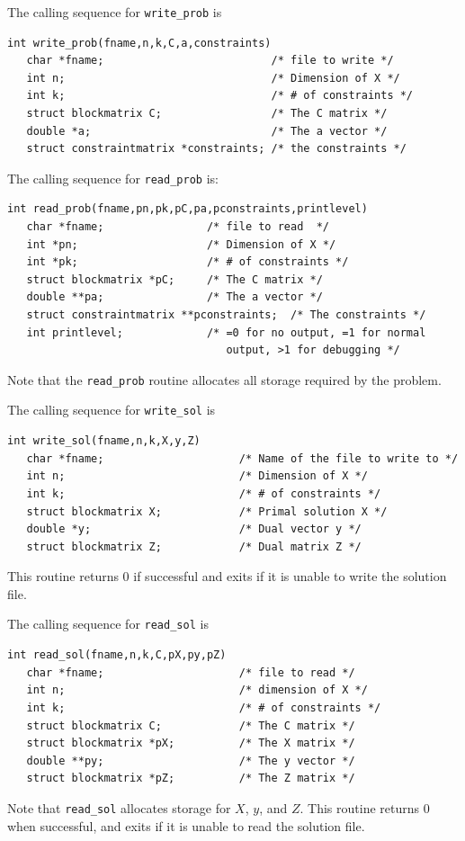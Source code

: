 \documentclass{article}
\begin{document}
The calling sequence for {\tt write\_prob} is 

\begin{verbatim}
int write_prob(fname,n,k,C,a,constraints)
   char *fname;                          /* file to write */
   int n;                                /* Dimension of X */
   int k;                                /* # of constraints */
   struct blockmatrix C;                 /* The C matrix */
   double *a;                            /* The a vector */
   struct constraintmatrix *constraints; /* the constraints */
\end{verbatim}

The calling sequence for {\tt read\_prob} is:

\begin{verbatim} 
int read_prob(fname,pn,pk,pC,pa,pconstraints,printlevel)
   char *fname;                /* file to read  */
   int *pn;                    /* Dimension of X */
   int *pk;                    /* # of constraints */
   struct blockmatrix *pC;     /* The C matrix */
   double **pa;                /* The a vector */
   struct constraintmatrix **pconstraints;  /* The constraints */
   int printlevel;             /* =0 for no output, =1 for normal
                                  output, >1 for debugging */
\end{verbatim}
Note that the {\tt read\_prob} routine allocates all storage required
by the problem.  
 
The calling sequence for {\tt write\_sol} is 

\begin{verbatim}
int write_sol(fname,n,k,X,y,Z)
   char *fname;                     /* Name of the file to write to */
   int n;                           /* Dimension of X */
   int k;                           /* # of constraints */
   struct blockmatrix X;            /* Primal solution X */
   double *y;                       /* Dual vector y */
   struct blockmatrix Z;            /* Dual matrix Z */
\end{verbatim}
This routine returns 0 if successful and exits if it is unable to write
the solution file.  

The calling sequence for {\tt read\_sol} is 

\begin{verbatim}
int read_sol(fname,n,k,C,pX,py,pZ)
   char *fname;                     /* file to read */
   int n;                           /* dimension of X */
   int k;                           /* # of constraints */
   struct blockmatrix C;            /* The C matrix */
   struct blockmatrix *pX;          /* The X matrix */
   double **py;                     /* The y vector */
   struct blockmatrix *pZ;          /* The Z matrix */
\end{verbatim}
Note that {\tt read\_sol} allocates storage for $X$, $y$, and $Z$.  This
routine returns 0 when successful, and exits if it is unable to read
the solution file.  
\end{document}

